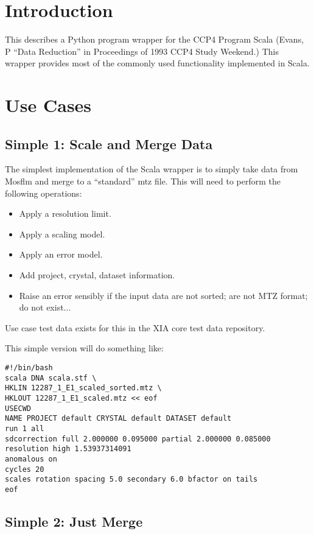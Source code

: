 \documentclass[a4paper, 11pt]{article}
\begin{document}
\section{Introduction}

This describes a Python program wrapper for the CCP4 Program Scala
(Evans, P ``Data Reduction'' in Proceedings of 1993 CCP4 Study Weekend.)
This wrapper provides most of the commonly used functionality implemented
in Scala.

\section{Use Cases}

\subsection{Simple 1: Scale and Merge Data}

The simplest implementation of the Scala wrapper is to simply take data 
from Mosflm and merge to a ``standard'' mtz file. This will need to perform
the following operations:

\begin{itemize}
\item{Apply a resolution limit.}
\item{Apply a scaling model.}
\item{Apply an error model.}
\item{Add project, crystal, dataset information.}
\item{Raise an error sensibly if the input data are not sorted; are
not MTZ format; do not exist...}
\end{itemize}

Use case test data exists for this in the XIA core test data repository.

This simple version will do something like:

{
\tiny
\begin{verbatim}
#!/bin/bash
scala DNA scala.stf \
HKLIN 12287_1_E1_scaled_sorted.mtz \
HKLOUT 12287_1_E1_scaled.mtz << eof
USECWD
NAME PROJECT default CRYSTAL default DATASET default
run 1 all
sdcorrection full 2.000000 0.095000 partial 2.000000 0.085000
resolution high 1.53937314091
anomalous on
cycles 20
scales rotation spacing 5.0 secondary 6.0 bfactor on tails
eof
\end{verbatim}
}

\subsection{Simple 2: Just Merge}
\end{document}
